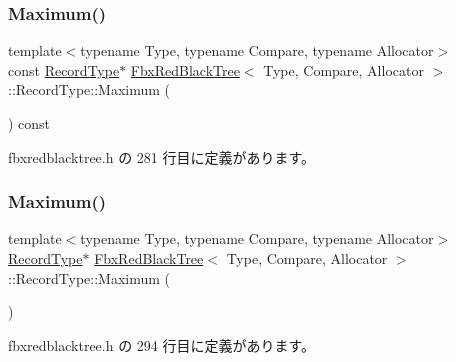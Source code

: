 \subsubsection{\texorpdfstring{Maximum()}{Maximum()}\hspace{0.1cm}{\footnotesize\ttfamily [1/2]}}
{\footnotesize\ttfamily template$<$typename Type, typename Compare, typename Allocator$>$ \\
const \hyperlink{class_fbx_red_black_tree_1_1_record_type}{Record\+Type}$\ast$ \hyperlink{class_fbx_red_black_tree}{Fbx\+Red\+Black\+Tree}$<$ Type, Compare, Allocator $>$\+::Record\+Type\+::\+Maximum (\begin{DoxyParamCaption}{ }\end{DoxyParamCaption}) const\hspace{0.3cm}{\ttfamily [inline]}}



 fbxredblacktree.\+h の 281 行目に定義があります。

\mbox{\label{class_fbx_red_black_tree_1_1_record_type_a6168efad3c4168277be9c9bea791d88f}} 
\subsubsection{\texorpdfstring{Maximum()}{Maximum()}\hspace{0.1cm}{\footnotesize\ttfamily [2/2]}}
{\footnotesize\ttfamily template$<$typename Type, typename Compare, typename Allocator$>$ \\
\hyperlink{class_fbx_red_black_tree_1_1_record_type}{Record\+Type}$\ast$ \hyperlink{class_fbx_red_black_tree}{Fbx\+Red\+Black\+Tree}$<$ Type, Compare, Allocator $>$\+::Record\+Type\+::\+Maximum (\begin{DoxyParamCaption}{ }\end{DoxyParamCaption})\hspace{0.3cm}{\ttfamily [inline]}}



 fbxredblacktree.\+h の 294 行目に定義があります。

\mbox{\label{class_fbx_red_black_tree_1_1_record_type_ac7846a2d9d25168a1f9d62b53b2ffa8b}} 
